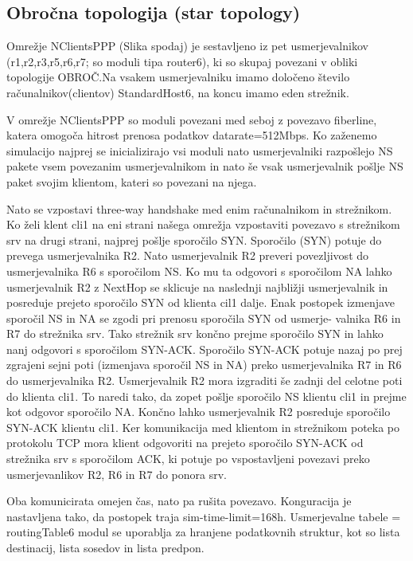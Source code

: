 \documentclass[11pt,a4paper,slovene]{myarticle}
\begin{document}
\subsection{Obročna topologija (star topology)}

Omrežje NClientsPPP (Slika spodaj) je sestavljeno iz pet usmerjevalnikov (r1,r2,r3,r5,r6,r7; so
moduli tipa router6), ki so skupaj povezani v obliki topologije OBROČ.Na vsakem usmerjevalniku 
imamo določeno število računalnikov(clientov) StandardHost6, na koncu imamo eden strežnik.

V omrežje NClientsPPP so moduli povezani med seboj z povezavo fiberline, katera omogoča hitrost prenosa podatkov datarate=512Mbps.
Ko zaženemo simulacijo najprej se inicializirajo vsi moduli nato usmerjevalniki razpošlejo NS pakete vsem povezanim usmerjevalnikom in nato še vsak usmerjevalnik pošlje NS paket svojim klientom, kateri so povezani na njega.

Nato se vzpostavi three-way handshake med enim računalnikom in strežnikom. 
Ko želi klent cli1 na eni strani našega omrežja vzpostaviti povezavo s strežnikom srv na drugi strani, najprej pošlje sporočilo SYN. Sporočilo (SYN) potuje do prevega usmerjevalnika R2.
Nato usmerjevalnik R2 preveri povezljivost do usmerjevalnika R6 s sporočilom NS. Ko mu ta odgovori s sporočilom NA lahko usmerjevalnik R2 z NextHop se sklicuje na naslednji najbližji usmerjevalnik in posreduje prejeto sporočilo SYN od klienta cil1 dalje.
Enak postopek izmenjave sporočil NS in NA se zgodi pri prenosu sporočila SYN od usmerje-
valnika R6 in R7 do strežnika srv. Tako strežnik srv končno prejme sporočilo SYN in lahko nanj
odgovori s sporočilom SYN-ACK. Sporočilo SYN-ACK potuje nazaj po prej zgrajeni sejni poti
(izmenjava sporočil NS in NA) preko usmerjevalnika R7 in R6 do usmerjevalnika R2. Usmerjevalnik
R2 mora izgraditi še zadnji del celotne poti do klienta cli1. To naredi tako, da zopet pošlje
sporočilo NS klientu cli1 in prejme kot odgovor sporočilo NA. Končno lahko usmerjevalnik
R2 posreduje sporočilo SYN-ACK klientu cli1. Ker komunikacija med klientom in strežnikom
poteka po protokolu TCP mora klient odgovoriti na prejeto sporočilo SYN-ACK od strežnika
srv s sporočilom ACK, ki potuje po  vspostavljeni povezavi preko usmerjevanlikov R2, R6 in
R7 do ponora srv.

Oba komunicirata omejen čas, nato pa rušita povezavo. Konguracija je nastavljena tako, da postopek traja sim-time-limit=168h.
Usmerjevalne tabele = routingTable6 modul se uporablja za hranjene podatkovnih struktur, kot so lista destinacij, lista sosedov in lista predpon.
\end{document}
